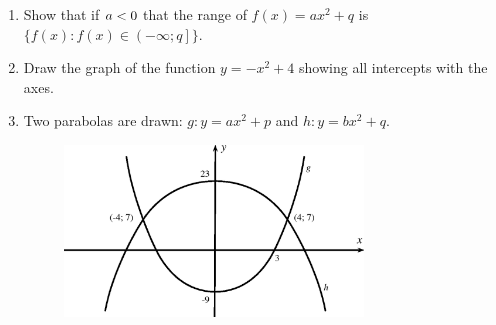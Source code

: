           
          \label{m39345*id245690}\begin{enumerate}[noitemsep, label=\textbf{\arabic*}. ] 
            \label{m39345*uid130}\item Show that if \begin{math}a<{}0\end{math} that the range of \begin{math}f\left(x\right)=a{x}^{2}+q\end{math} is \begin{math}\{f\left(x\right):f\left(x\right)\in \left(-\infty ;q\right]\}\end{math}.
        \label{m39345*uid131}\item Draw the graph of the function \begin{math}y=-{x}^{2}+4\end{math} showing all intercepts with the axes.
        
\label{m39345*uid132}\item Two parabolas are drawn: \begin{math}g:y=a{x}^{2}+p\end{math} and \begin{math}h:y=b{x}^{2}+q\end{math}.


    \setcounter{subfigure}{0}


	\begin{figure}[H] %
    \begin{center}
    \label{m39345*id245918!!!underscore!!!media}\label{m39345*id245918!!!underscore!!!printimage}\includegraphics[width=300px]{col11306.imgs/m39345_MG10C11_020.png} %
        
      \vspace{2pt}
    \vspace{.1in}
    
    \end{center}

 \end{figure}   


\end{enumerate}
